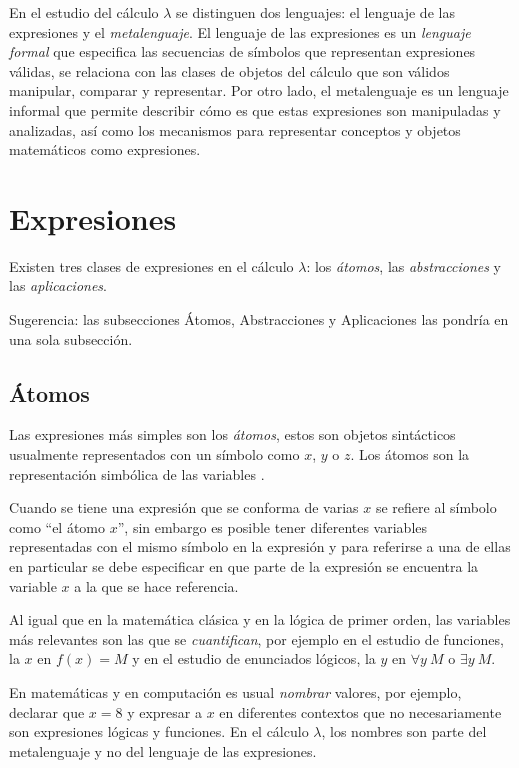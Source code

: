 En el estudio del cálculo \( λ \) se distinguen dos lenguajes: el lenguaje de las expresiones y el \emph{metalenguaje}. El lenguaje de las expresiones es un \emph{lenguaje formal} que especifica las secuencias de símbolos que representan expresiones válidas, se relaciona con las clases de objetos del cálculo que son válidos manipular, comparar y representar. Por otro lado, el metalenguaje es un lenguaje informal que permite describir cómo es que estas expresiones son manipuladas y analizadas, así como los mecanismos para representar conceptos y objetos matemáticos como expresiones.

\section{Expresiones}
\label{sec:expresiones}

Existen tres clases de expresiones en el cálculo \( λ \): los \emph{átomos}, las \emph{abstracciones} y las \emph{aplicaciones}.

\begin{Gutu}
Sugerencia: las subsecciones Átomos, Abstracciones y Aplicaciones las pondría en una sola subsección.
\end{Gutu}
\subsection{Átomos}
\label{sec:atomos}

Las expresiones más simples son los \emph{átomos}, estos son objetos sintácticos usualmente representados con un símbolo como \( x \), \( y \) o \( z \). Los átomos son la representación simbólica de las variables \cite[p.~577]{Barendregt:Bible}.

Cuando se tiene una expresión que se conforma de varias \( x \) se refiere al símbolo como ``el átomo \( x \)'', sin embargo es posible tener diferentes variables representadas con el mismo símbolo en la expresión y para referirse a una de ellas en particular se debe especificar en que parte de la expresión se encuentra la variable \( x \) a la que se hace referencia.

Al igual que en la matemática clásica y en la lógica de primer orden, las variables más relevantes son las que se \emph{cuantifican}, por ejemplo en el estudio de funciones, la \( x \) en \( f(x) = M \) y en el estudio de enunciados lógicos, la \( y \) en \( \forall y\ M \) o \( \exists y\ M \).

En matemáticas y en computación es usual \emph{nombrar} valores, por ejemplo, declarar que \( x = 8 \) y expresar a \( x \) en diferentes contextos que no necesariamente son expresiones lógicas y funciones. En el cálculo \( λ \), los nombres son parte del metalenguaje y no del lenguaje de las expresiones.

